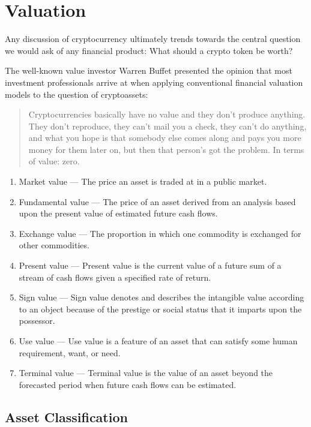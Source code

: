 \chapter{Valuation}

Any discussion of cryptocurrency ultimately trends towards the central question we would ask of any financial product: What should a crypto token be worth?

The well-known value investor Warren Buffet presented the opinion that most investment professionals arrive at when applying conventional financial valuation models to the question of cryptoassets:

\begin{quote}
Cryptocurrencies basically have no value and they don't produce anything. They
don't reproduce, they can't mail you a check, they can't do anything, and what
you hope is that somebody else comes along and pays you more money for them
later on, but then that person's got the problem. In terms of value: zero.
\end{quote}

\begin{enumerate}
\item Market value --- The price an asset is traded at in a public market.
\item Fundamental value --- The price of an asset derived from an analysis based upon the present value of estimated future cash flows.
\item Exchange value --- The proportion in which one commodity is exchanged for other commodities.
\item Present value --- Present value is the current value of a future sum of a stream of cash flows given a specified rate of return.
\item Sign value --- Sign value denotes and describes the intangible value according to an object because of the prestige or social status that it imparts upon the possessor.
\item Use value --- Use value is a feature of an asset that can satisfy some human requirement, want, or need.
\item Terminal value --- Terminal value is the value of an asset beyond the forecasted period when future cash flows can be estimated.
\end{enumerate}

\section{Asset Classification}

